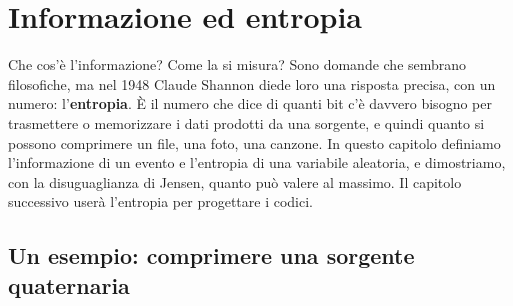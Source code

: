 \chapter{Informazione ed entropia}

Che cos'è l'informazione? Come la si misura? Sono domande che sembrano filosofiche, ma nel 1948 Claude Shannon diede
loro una risposta precisa, con un numero: l'\textbf{entropia}. È il numero che dice di quanti bit c'è davvero bisogno per
trasmettere o memorizzare i dati prodotti da una sorgente, e quindi quanto si possono comprimere un file, una foto, una
canzone. In questo capitolo definiamo l'informazione di un evento e l'entropia di una variabile aleatoria, e
dimostriamo, con la disuguaglianza di Jensen, quanto può valere al massimo. Il capitolo successivo userà l'entropia per
progettare i codici.

\section{Un esempio: comprimere una sorgente quaternaria}

